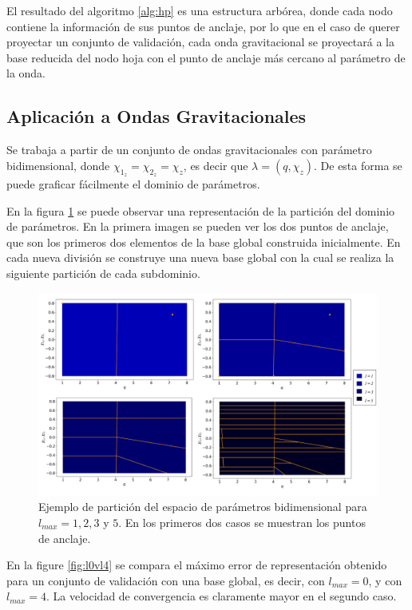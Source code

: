 El resultado del algoritmo \ref{alg:hp} es una estructura arbórea, donde cada nodo contiene la información de sus puntos de anclaje, por lo que en el caso de querer proyectar un conjunto de validación, cada onda gravitacional se proyectará a la base reducida del nodo hoja con el punto de anclaje más cercano al parámetro de la onda.


\subsection{Aplicación a Ondas Gravitacionales}

Se trabaja a partir de un conjunto de ondas gravitacionales con parámetro bidimensional, donde $\chi_{1_z} = \chi_{2_z} = \chi_z$, es decir que $\lambda = (q, \chi_z)$. De esta forma se puede graficar fácilmente el dominio de parámetros.



En la figura \ref{fig:part1} se puede observar una representación de la partición del dominio de parámetros. En la primera imagen se pueden ver los dos puntos de anclaje, que son los primeros dos elementos de la base global construida inicialmente. En cada nueva división se construye una nueva base global con la cual se realiza la siguiente partición de cada subdominio.


\begin{figure}[h!]
\centering
\includegraphics[width=1\columnwidth]{figs/particion2d.png}
\caption{Ejemplo de partición del espacio de parámetros bidimensional para $l_{max}= 1, 2, 3$ y $5$. En los primeros dos casos se muestran los puntos de anclaje.}
\label{fig:part1}
\end{figure}


En la figure \ref{fig:l0vl4} se compara el máximo error de representación obtenido para un conjunto de validación con una base global, es decir, con $l_{max} = 0$, y con $l_{max}=4$. La velocidad de convergencia es claramente mayor en el segundo caso.

